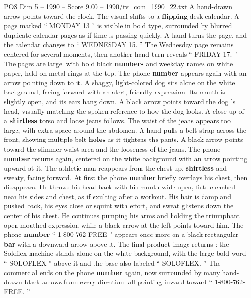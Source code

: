 \begin{textsample}{POS Dim 5 – 1990 – Score 9.00 – 1990/tv\_com\_1990\_22.txt}
A hand-drawn arrow points toward the clock.
The visual shifts to a \textbf{flipping} desk calendar.
A page marked “ MONDAY 13 ” is visible in bold type, surrounded by blurred duplicate calendar pages as if time is passing quickly.
A hand turns the page, and the calendar changes to “ WEDNESDAY 15. ” The Wednesday page remains centered for several moments, then another hand turn reveals “ FRIDAY 17. ” The pages are large, with bold black \textbf{numbers} and weekday names on white paper, held on metal rings at the top.
The phone \textbf{number} appears again with an arrow pointing down to it.
A shaggy, light-colored dog sits alone on the white background, facing forward with an alert, friendly expression.
Its mouth is slightly open, and its ears hang down.
A black arrow points toward the dog ’s head, visually matching the spoken reference to how the dog looks.
A close-up of a \textbf{shirtless} torso and loose jeans follows.
The waist of the jeans appears too large, with extra space around the abdomen.
A hand pulls a belt strap across the front, showing multiple belt \textbf{holes} as it tightens the pants.
A black arrow points toward the slimmer waist area and the looseness of the jeans.
The phone \textbf{number} returns again, centered on the white background with an arrow pointing upward at it.
The athletic man reappears from the chest up, \textbf{shirtless} and sweaty, facing forward.
At first the phone \textbf{number} briefly overlays his chest, then disappears.
He throws his head back with his mouth wide open, fists clenched near his sides and chest, as if exulting after a workout.
His hair is damp and pushed back, his eyes close or squint with effort, and sweat glistens down the center of his chest.
He continues pumping his arms and holding the triumphant open-mouthed expression while a black arrow at the left points toward him.
The phone \textbf{number} “ 1-800-762-FREE ” appears once more on a black rectangular \textbf{bar} with a downward arrow above it.
The final product image returns : the Soloflex machine stands alone on the white background, with the large bold word “ SOLOFLEX ” above it and the base also labeled “ SOLOFLEX. ” The commercial ends on the phone \textbf{number} again, now surrounded by many hand-drawn black arrows from every direction, all pointing inward toward “ 1-800-762-FREE. ”

\end{textsample}
